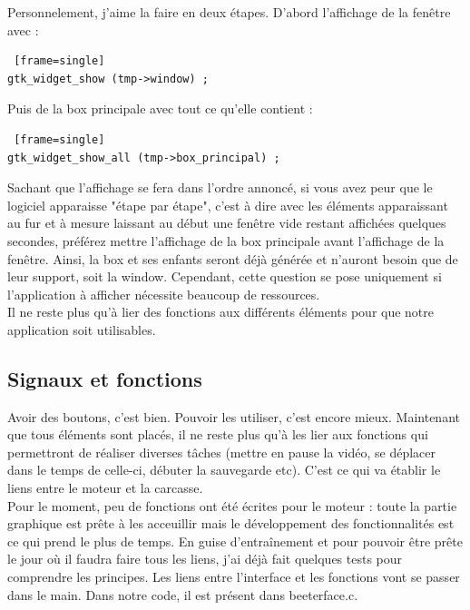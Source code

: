 \documentclass[11pt,french,a4paper]{report}
\begin{document}
Personnelement, j'aime la faire en deux étapes. D'abord l'affichage de la fenêtre avec : \\
\begin{lstlisting} [frame=single]
gtk_widget_show (tmp->window) ;
\end{lstlisting}

Puis de la box principale avec tout ce qu'elle contient : \\
\begin{lstlisting} [frame=single]
gtk_widget_show_all (tmp->box_principal) ; 
\end{lstlisting}

Sachant que l'affichage se fera dans l'ordre annoncé, si vous avez peur que le logiciel apparaisse "étape par étape", c'est à 
dire avec les éléments apparaissant au fur et à mesure laissant au début une fenêtre vide restant affichées quelques secondes, 
préférez mettre l'affichage de la box principale avant l'affichage de la fenêtre. Ainsi, la box et ses enfants seront déjà générée 
et n'auront besoin que de leur support, soit la window. Cependant, cette question se pose uniquement si l'application 
à afficher nécessite beaucoup de ressources. \\

Il ne reste plus qu'à lier des fonctions aux différents éléments pour que notre application soit utilisables.\\
        
        \subsection{Signaux et fonctions} 
Avoir des boutons, c'est bien. Pouvoir les utiliser, c'est encore mieux. Maintenant que tous éléments sont placés, 
il ne reste plus qu'à les lier aux fonctions qui permettront de réaliser diverses tâches (mettre en pause la vidéo,
se déplacer dans le temps de celle-ci, débuter la sauvegarde etc).    
C'est ce qui va établir le liens entre le moteur et la carcasse. \\
Pour le moment, peu de fonctions ont été écrites pour le moteur : toute la partie graphique est prête à les acceuillir 
mais le développement des fonctionnalités est ce qui prend le plus de temps. En guise d'entraînement et pour 
pouvoir être prête le jour où il faudra faire tous les liens, j'ai déjà fait quelques tests pour comprendre les principes.
Les liens entre l'interface et les fonctions vont se passer dans le main. Dans notre code, il est présent dans beeterface.c.\\
\end{document}
